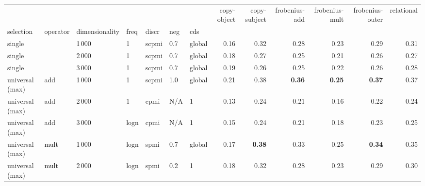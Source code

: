 \begin{tabular}{lllllllrrrrrr}
\toprule
       & {} &      &   &      &     &   &  copy-object &  copy-subject &  frobenius-add &  frobenius-mult &  frobenius-outer &  relational \\
selection & operator & dimensionality & freq & discr & neg & cds &              &               &                &                 &                  &             \\
\midrule
single                 & {}   & 1\,000 & 1    & scpmi & 0.7 & global &                 0.16  &                  0.32  &                   0.28  &                    0.23  &                     0.29  &                0.31  \\
single                 & {}   & 2\,000 & 1    & scpmi & 0.7 & global &                 0.18  &                  0.27  &                   0.25  &                    0.21  &                     0.26  &                0.27  \\
single                 & {}   & 3\,000 & 1    & scpmi & 0.7 & global &                 0.19  &                  0.26  &                   0.25  &                    0.22  &                     0.26  &                0.28  \\ \addlinespace
universal (max)        & add  & 1\,000 & 1    & scpmi & 1.0 & global &                 0.21  &                  0.38  &           \textbf{0.36} &            \textbf{0.25} &             \textbf{0.37} &                0.37  \\
universal (max)        & add  & 2\,000 & 1    & cpmi  & N/A & 1      &                 0.13  &                  0.24  &                   0.21  &                    0.16  &                     0.22  &                0.24  \\
universal (max)        & add  & 3\,000 & logn & cpmi  & N/A & 1      &                 0.15  &                  0.24  &                   0.21  &                    0.18  &                     0.23  &                0.25  \\ \addlinespace
universal (max)        & mult & 1\,000 & logn & spmi  & 0.7 & global &                 0.17  &          \textbf{0.38} &                   0.33  &                    0.25  &             \textbf{0.34} &                0.35  \\
universal (max)        & mult & 2\,000 & logn & spmi  & 0.2 & 1      &                 0.18  &                  0.32  &                   0.28  &                    0.23  &                     0.29  &                0.30  \\

\end{tabular}
